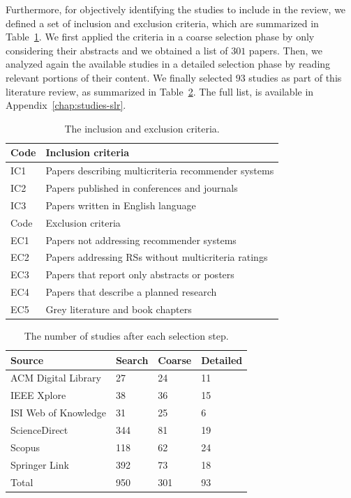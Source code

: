 Furthermore, for objectively identifying the studies to include in the review, we defined a set of inclusion and exclusion criteria, which are summarized in Table~\ref{mcr:tab:criteria}. We first applied the criteria in a coarse selection phase by only considering their abstracts and we obtained a list of $301$ papers. Then, we analyzed again the available studies in a detailed selection phase by reading relevant portions of their content. We finally selected $93$ studies as part of this literature review, as summarized in Table~\ref{mcr:tab:numbers}. The full list,  is available in Appendix~\ref{chap:studies-slr}.

\begin{table}
\centering
\begin{tabular}{@{}ll@{}}
\toprule
Code & Inclusion criteria \\ \midrule
IC1 & Papers describing multicriteria recommender systems \\
IC2 & Papers published in conferences and journals \\
IC3 & Papers written in English language \\ \midrule
Code & Exclusion criteria \\ \midrule
EC1 & Papers not addressing recommender systems \\
EC2 & Papers addressing RSs without multicriteria ratings \\
EC3 & Papers that report only abstracts or posters \\
EC4 & Papers that describe a planned research\footnotemark \\
EC5 & Grey literature and book chapters \\ \bottomrule
\end{tabular}
\caption[Inclusion and exclusion criteria]{The inclusion and exclusion criteria.}
\label{mcr:tab:criteria}
\end{table}

\begin{table}
\centering
\begin{tabular}{@{}llll@{}}
\toprule
Source               & Search & Coarse & Detailed \\ \midrule
ACM Digital Library  & 27     & 24     & 11       \\
IEEE Xplore          & 38     & 36     & 15       \\
ISI Web of Knowledge & 31     & 25     & 6        \\
ScienceDirect        & 344    & 81     & 19       \\
Scopus               & 118    & 62     & 24       \\
Springer Link        & 392    & 73     & 18       \\ \midrule
Total                & 950    & 301    & 93       \\ \bottomrule
\end{tabular}
\caption[Studies per selection step]{The number of studies after each selection step.}
\label{mcr:tab:numbers}
\end{table}


